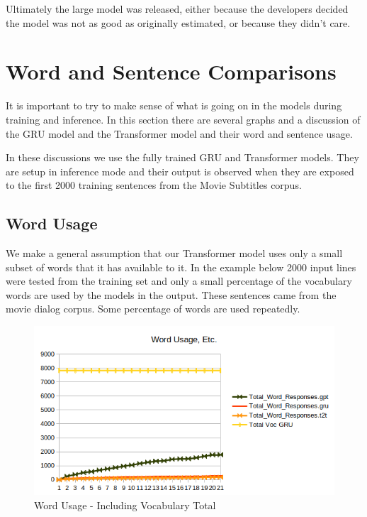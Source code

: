 Ultimately the large model was released, either because the developers decided the model was not as good as originally estimated, or because they didn't care. 

\section{Word and Sentence Comparisons}

It is important to try to make sense of what is going on in the models during training and inference. In this section there are several graphs and a discussion of the GRU model and the Transformer model and their word and sentence usage.

In these discussions we use the fully trained GRU and Transformer models. They are setup in inference mode and their output is observed when they are exposed to the first 2000 training sentences from the Movie Subtitles corpus.

\subsection{Word Usage}

We make a general assumption that our Transformer model uses only a small subset of words that it has available to it. In the example below 2000 input lines were tested from the training set and only a small percentage of the vocabulary words are used by the models in the output. These sentences came from the movie dialog corpus. Some percentage of words are used repeatedly.

\begin{figure}[H]
	\begin{center}
		\includegraphics[scale=0.75]{diagram-word02}
		
		
	\end{center}
	\caption[Word Usage]{Word Usage - Including Vocabulary Total}
	
	
\end{figure}

